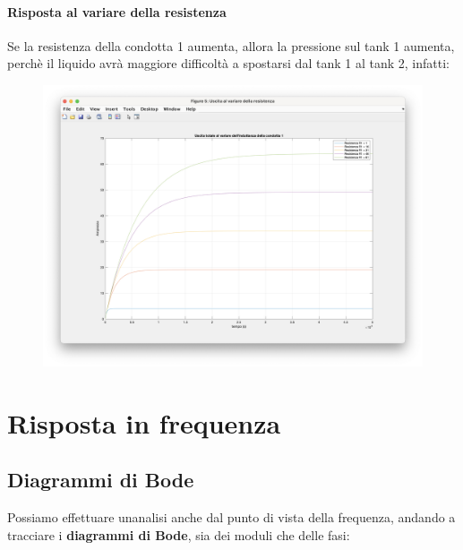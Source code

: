 \documentclass[
]{article}
\begin{document}
\newpage

\hypertarget{risposta-al-variare-della-resistenza}{%
\paragraph{Risposta al variare della
resistenza}\label{risposta-al-variare-della-resistenza}}

Se la resistenza della condotta 1 aumenta, allora la pressione sul tank
1 aumenta, perchè il liquido avrà maggiore difficoltà a spostarsi dal
tank 1 al tank 2, infatti:

\begin{figure}
    \centering
    \includegraphics[width=0.7\linewidth]{images/image-20240107210512401.png}
    
    
\end{figure}

\newpage
\section{Risposta in frequenza}
\hypertarget{diagrammi-di-bode}{%
\subsection{Diagrammi di Bode}\label{diagrammi-di-bode}}

Possiamo effettuare un\textquotesingle analisi anche dal punto di vista
della frequenza, andando a tracciare i \textbf{diagrammi di Bode}, sia
dei moduli che delle fasi:
\end{document}
